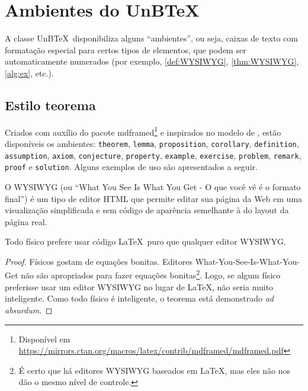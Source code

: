 \chapter{Ambientes do UnB\TeX}

A classe UnB\TeX\ disponibiliza alguns ``ambientes'', ou seja, caixas de texto com formatação especial para certos tipos de elementos, que podem ser automaticamente numerados (por exemplo, \cref{def:WYSIWYG}, \cref{thm:WYSIWYG}, \cref{alg:ex}, etc.).

\section{Estilo teorema}

Criados com auxílio do pacote \textsf{mdframed}\footnote{Disponível em \url{https://mirrors.ctan.org/macros/latex/contrib/mdframed/mdframed.pdf}} e inspirados no modelo de , estão disponíveis os ambientes: \texttt{theorem}, \texttt{lemma}, \texttt{proposition}, \texttt{corollary}, \texttt{definition}, \texttt{as\-sumption}, \texttt{axiom}, \texttt{conjecture}, \texttt{property}, \texttt{example}, \texttt{exercise}, \texttt{problem}, \texttt{remark}, \texttt{proof} e \texttt{solution}. Alguns exemplos de uso são apresentados a seguir.

\begin{definition}\label{def:WYSIWYG}
O WYSIWYG (ou ``What You See Is What You Get - O que você vê é o formato final'') é um tipo de editor HTML que permite editar sua página da Web em uma visualização simplificada e sem código de aparência semelhante à do layout da página real.
\end{definition}

\begin{theorem}\label{thm:WYSIWYG}
    Todo físico prefere usar código \LaTeX\ puro que qualquer editor WYSIWYG.
\end{theorem}

\begin{proof}
    Físicos gostam de equações bonitas. Editores What-You-See-Is-What-You-Get não são apropriados para fazer equações bonitas\footnote{É certo que há editores WYSIWYG baseados em \LaTeX, mas eles não nos dão o mesmo nível de controle.}. Logo, se algum físico preferisse usar um editor WYSIWYG no lugar de \LaTeX, não seria muito inteligente. Como todo físico é inteligente, o teorema está demonstrado \textit{ad absurdum}.
\end{proof}

